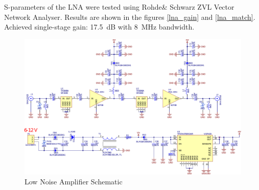 S-parameters of the LNA were tested using Rohde\& Schwarz ZVL Vector Network Analyser. Results are shown in the figures \ref{lna_gain} and \ref{lna_match}. Achieved single-stage gain: \SI{17.5}{\dB} with \SI{8}{\MHz} bandwidth.

\begin{landscape}
\begin{figure}
    \centering
    \includegraphics[width=1.12\paperwidth]{img/7/lna_schematic.pdf}
    \caption{Low Noise Amplifier Schematic}
    \label{lna_schematic}
\end{figure}
\end{landscape}

